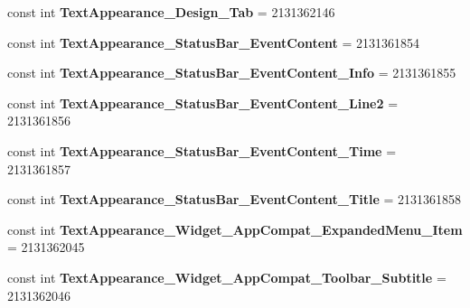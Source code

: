 \begin{DoxyCompactItemize}
const int {\bfseries Text\+Appearance\+\_\+\+Design\+\_\+\+Tab} = 2131362146
\item 
\mbox{\label{class_pinned_app_1_1_droid_1_1_resource_1_1_style_a7f8d0a785e78fd819be422e726962b6e}} 
const int {\bfseries Text\+Appearance\+\_\+\+Status\+Bar\+\_\+\+Event\+Content} = 2131361854
\item 
\mbox{\label{class_pinned_app_1_1_droid_1_1_resource_1_1_style_ad5be5bf23caf01774e948f7c7e41923d}} 
const int {\bfseries Text\+Appearance\+\_\+\+Status\+Bar\+\_\+\+Event\+Content\+\_\+\+Info} = 2131361855
\item 
\mbox{\label{class_pinned_app_1_1_droid_1_1_resource_1_1_style_a4a42ded553158cbecd1e769a543f31d7}} 
const int {\bfseries Text\+Appearance\+\_\+\+Status\+Bar\+\_\+\+Event\+Content\+\_\+\+Line2} = 2131361856
\item 
\mbox{\label{class_pinned_app_1_1_droid_1_1_resource_1_1_style_ae123978140fc3f4c071602e2459d26da}} 
const int {\bfseries Text\+Appearance\+\_\+\+Status\+Bar\+\_\+\+Event\+Content\+\_\+\+Time} = 2131361857
\item 
\mbox{\label{class_pinned_app_1_1_droid_1_1_resource_1_1_style_a2cc71e51d801b449ec5be4af2c5dc7d1}} 
const int {\bfseries Text\+Appearance\+\_\+\+Status\+Bar\+\_\+\+Event\+Content\+\_\+\+Title} = 2131361858
\item 
\mbox{\label{class_pinned_app_1_1_droid_1_1_resource_1_1_style_aeea69ff22173b86cb52076ee24e82625}} 
const int {\bfseries Text\+Appearance\+\_\+\+Widget\+\_\+\+App\+Compat\+\_\+\+Expanded\+Menu\+\_\+\+Item} = 2131362045
\item 
\mbox{\label{class_pinned_app_1_1_droid_1_1_resource_1_1_style_a5d728940e874347999d565a4457bcd37}} 
const int {\bfseries Text\+Appearance\+\_\+\+Widget\+\_\+\+App\+Compat\+\_\+\+Toolbar\+\_\+\+Subtitle} = 2131362046
\item 
\mbox{\label{class_pinned_app_1_1_droid_1_1_resource_1_1_style_ac6c0472efeb0185a5e60c62c99a334c0}} 

\end{DoxyCompactItemize}
